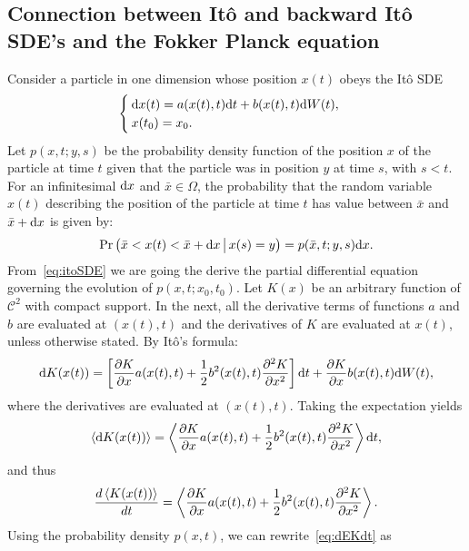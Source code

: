 \subsection{Connection between Itô and backward Itô SDE's and the Fokker Planck equation}
Consider a particle in one dimension whose position $x(t)$ obeys the Itô SDE
\begin{equation} \label{eq:itoSDE}
	\begin{cases}
		\rm dx(t) = a(x(t),t) \rm dt + b(x(t),t) \rm dW(t),\\
		x(t_0) = x_0. 
	\end{cases}
\end{equation}
Let $p(x,t;y,s)$ be the probability density function of the position $x$ of the particle at time $t$ given that the particle was in position $y$ at time $s$, with $s < t$. For an infinitesimal $\rm dx$ and $\bar{x} \in \Omega$, the probability that the random variable $x(t)$ describing the position of the particle at time $t$ has value between $\bar{x}$ and $\bar{x}+\rm dx$ is given by:
\begin{equation}
	\Pr\big(\bar{x} < x(t) < \bar{x} + \rm dx \,\big|\, x(s) = y\big) = p(\bar{x},t;y,s)\rm dx.
\end{equation}
 From~\eqref{eq:itoSDE} we are going the derive the partial differential equation governing the evolution of $p(x,t;x_0,t_0)$. Let $K(x)$ be an arbitrary function of $\mathcal{C}^2$ with compact support. In the next, all the derivative terms of functions $a$ and $b$ are evaluated at $(x(t),t)$ and the derivatives of $K$ are evaluated at $x(t)$, unless otherwise stated. By Itô's formula:
\begin{equation}
	\rm dK(x(t)) = \left[\frac{\partial K}{\partial x} a(x(t),t) + \frac{1}{2}b^2(x(t),t) \frac{\partial^2 K}{\partial x^2} \right] \rm dt + \frac{\partial K}{\partial x}b(x(t),t) \rm dW(t),
\end{equation}
where the derivatives are evaluated at $(x(t),t)$. Taking the expectation yields
\begin{equation}
	\esp{\rm dK(x(t))} = \esp{\frac{\partial K}{\partial x} a(x(t),t) + \frac{1}{2}b^2(x(t),t) \frac{\partial^2 K}{\partial x^2}} \rm dt,
\end{equation}
and thus
\begin{equation} \label{eq:dEKdt}
	\frac{d\esp{K(x(t))}}{dt} = \esp{\frac{\partial K}{\partial x} a(x(t),t) + \frac{1}{2}b^2(x(t),t) \frac{\partial^2 K}{\partial x^2}}.
\end{equation}
Using the probability density $p(x,t)$, we can rewrite~\eqref{eq:dEKdt} as
